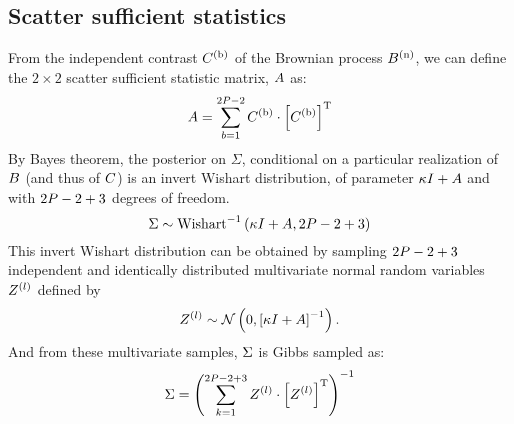 \subsection{Scatter sufficient statistics}
From the independent contrast $C^{(\text{b})}$ of the Brownian process $B^{(\text{n})}$, we can define the $2 \times 2$ scatter sufficient statistic matrix, $A$ as:
\begin{equation}
    A = \sum\limits_{b=1}^{2 P - 2} C^{(\text{b})} \cdot \left[C^{(\text{b})}\right]^{\mathrm{T}}
\end{equation}
By Bayes theorem, the \gls{posterior} on $\Sigma$, conditional on a particular realization of $B$ (and thus of $C$) is an invert Wishart distribution, of parameter $\kappa I + A$ and with $2 P - 2 + 3$ degrees of freedom.
\begin{equation}
    \Sigma \sim \mathrm{Wishart}^{-1}\left( \kappa I + A, 2 P - 2 + 3\right)
\end{equation}
This invert Wishart distribution can be obtained by sampling $2 P - 2 + 3$ independent and identically distributed multivariate normal random variables $Z^{(l)}$ defined by
\begin{equation}
    Z^{(l)} \sim \mathcal{N} \left( 0, \left[\kappa I + A\right]^{-1} \right).
\end{equation}
And from these multivariate samples, $\Sigma$ is Gibbs sampled as:
\begin{equation}
    \Sigma = \left( \sum\limits_{k=1}^{2 P - 2 + 3} Z^{(l)} \cdot \left[Z^{(l)} \right] ^{\mathrm{T}} \right)^{-1}
\end{equation}
